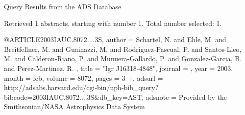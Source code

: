 Query Results from the ADS Database


Retrieved 1 abstracts, starting with number 1.  Total number selected: 1.

@ARTICLE{2003IAUC.8072....3S,
   author = {{Schartel}, N. and {Ehle}, M. and {Breitfellner}, M. and {Guainazzi}, M. and 
	{Rodriguez-Pascual}, P. and {Santos-Lleo}, M. and {Calderon-Riano}, P. and 
	{Munuera-Gallardo}, P. and {Gonzalez-Garcia}, B. and {Perez-Martinez}, R.
	},
    title = "{Igr J16318-4848}",
  journal = {\iaucirc},
     year = 2003,
    month = feb,
   volume = 8072,
    pages = {3-+},
   adsurl = {http://adsabs.harvard.edu/cgi-bin/nph-bib_query?bibcode=2003IAUC.8072....3S&db_key=AST},
  adsnote = {Provided by the Smithsonian/NASA Astrophysics Data System}
}



